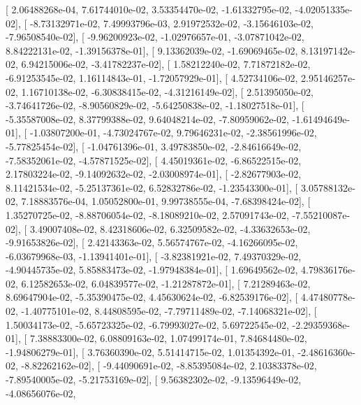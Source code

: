 \documentclass{article}
\begin{document}
       [  2.06488268e-04,   7.61744010e-02,   3.53354470e-02,
         -1.61332795e-02,  -4.02051335e-02],
       [ -8.73132971e-02,   7.49993796e-03,   2.91972532e-02,
         -3.15646103e-02,  -7.96508540e-02],
       [ -9.96200923e-02,  -1.02976657e-01,  -3.07871042e-02,
          8.84222131e-02,  -1.39156378e-01],
       [  9.13362039e-02,  -1.69069465e-02,   8.13197142e-02,
          6.94215006e-02,  -3.41782237e-02],
       [  1.58212240e-02,   7.71872182e-02,  -6.91253545e-02,
          1.16114843e-01,  -1.72057929e-01],
       [  4.52734106e-02,   2.95146257e-02,   1.16710138e-02,
         -6.30838415e-02,  -4.31216149e-02],
       [  2.51395050e-02,  -3.74641726e-02,  -8.90560829e-02,
         -5.64250838e-02,  -1.18027518e-01],
       [ -5.35587008e-02,   8.37799388e-02,   9.64048214e-02,
         -7.80959062e-02,  -1.61494649e-01],
       [ -1.03807200e-01,  -4.73024767e-02,   9.79646231e-02,
         -2.38561996e-02,  -5.77825454e-02],
       [ -1.04761396e-01,   3.49783850e-02,  -2.84616649e-02,
         -7.58352061e-02,  -4.57871525e-02],
       [  4.45019361e-02,  -6.86522515e-02,   2.17803224e-02,
         -9.14092632e-02,  -2.03008974e-01],
       [ -2.82677903e-02,   8.11421534e-02,  -5.25137361e-02,
          6.52832786e-02,  -1.23543300e-01],
       [  3.05788132e-02,   7.18883576e-04,   1.05052800e-01,
          9.99738555e-04,  -7.68398424e-02],
       [  1.35270725e-02,  -8.88706054e-02,  -8.18089210e-02,
          2.57091743e-02,  -7.55210087e-02],
       [  3.49007408e-02,   8.42318606e-02,   6.32509582e-02,
         -4.33632653e-02,  -9.91653826e-02],
       [  2.42143363e-02,   5.56574767e-02,  -4.16266095e-02,
         -6.03679968e-03,  -1.13941401e-01],
       [ -3.82381921e-02,   7.49370329e-02,  -4.90445735e-02,
          5.85883473e-02,  -1.97948384e-01],
       [  1.69649562e-02,   4.79836176e-02,   6.12582653e-02,
          6.04839577e-02,  -1.21287872e-01],
       [  7.21289463e-02,   8.69647904e-02,  -5.35390475e-02,
          4.45630624e-02,  -6.82539176e-02],
       [  4.47480778e-02,  -1.40775101e-02,   8.44808595e-02,
         -7.79711489e-02,  -7.14068321e-02],
       [  1.50034173e-02,  -5.65723325e-02,  -6.79993027e-02,
          5.69722545e-02,  -2.29359368e-01],
       [  7.38883300e-02,   6.08809163e-02,   1.07499174e-01,
          7.84684480e-02,  -1.94806279e-01],
       [  3.76360390e-02,   5.51414715e-02,   1.01354392e-01,
         -2.48616360e-02,  -8.82262162e-02],
       [ -9.44090691e-02,  -8.85395084e-02,   2.10383378e-02,
         -7.89540005e-02,  -5.21753169e-02],
       [  9.56382302e-02,  -9.13596449e-02,  -4.08656076e-02,
\end{document}

